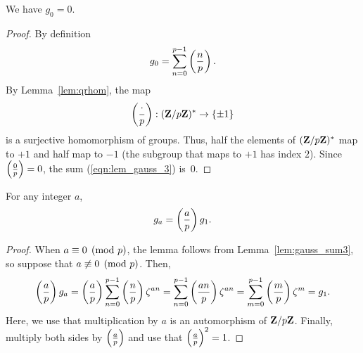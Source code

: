 \begin{lemma}\label{lem:gauss_sum3}
We have $g_0=0$.
\end{lemma}
\begin{proof}
By definition
\begin{equation}\label{eqn:lem_gauss_3}
g_0 = \sum_{n=0}^{p-1} \left(\frac{n}{p}\right).
\end{equation}
By Lemma~\ref{lem:qrhom}, the map
$$
\left(\frac{\cdot}{p}\right) : (\mathbf{Z}/p\mathbf{Z}{})^* \rightarrow \{\pm 1\}
$$
is a surjective homomorphism of groups.  Thus,  half the
elements of $(\mathbf{Z}/p\mathbf{Z}{})^*$ map to $+1$ and half map to $-1$ (the
subgroup that maps to $+1$ has index $2$).  Since $\left(\frac{0}{p}\right)=0$, the
sum (\ref{eqn:lem_gauss_3}) is~$0$.
\end{proof}

\begin{lemma}\label{lem:gauss_sum4}
For any integer $a$,
$$
 g_a = \left(\frac{a}{p}\right)g_1.
$$
\end{lemma}
\begin{proof}
When $a\equiv 0\pmod{p}$, the lemma follows from
Lemma~\ref{lem:gauss_sum3}, so suppose that $a\not\equiv 0\pmod{p}$.  Then,
$$
\left(\frac{a}{p}\right) g_a = \left(\frac{a}{p}\right) \sum_{n=0}^{p-1} \left(\frac{n}{p}\right) \zeta^{an} = \sum_{n=0}^{p-1}\left(\frac{an}{p}\right) \zeta^{an} = \sum_{m=0}^{p-1}\left(\frac{m}{p}\right)\zeta^{m} = g_1.
$$
Here, we use that multiplication by $a$ is
an automorphism of $\mathbf{Z}/p\mathbf{Z}{}$.  Finally, multiply both sides by
$\left(\frac{a}{p}\right)$ and use that $\left(\frac{a}{p}\right)^2=1$.
\end{proof}

